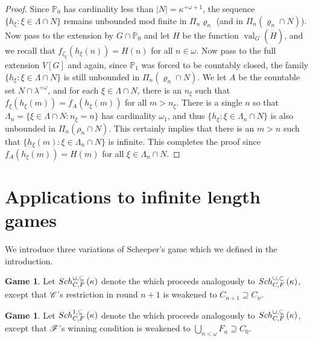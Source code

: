 \documentclass{amsart}
\theoremstyle{plain}
\theoremstyle{definition}
\newtheorem{game}[theorem]{Game}
\theoremstyle{remark}
\theoremstyle{plain}
\theoremstyle{definition}
\theoremstyle{remark}
\begin{document}
\begin{proof}
             Since $\mathbb P_0$ has cardinality less than $|N|=\kappa^{+\omega+1}$,
              the sequence $\{ h_\xi : \xi \in \Lambda\cap N\}$ remains unbounded
              mod finite in $\Pi_n \varrho_n$ (and in
               $\Pi_n (\varrho_n\cap N)$).  Now pass to the extension by
                $G\cap \mathbb P_0$ and let $H$ be the function
                 $\operatorname{val}_{G}(\dot H)$, and we recall
                 that $f_{\zeta_\xi}(h_\xi(n)) = H(n)$ for all $n\in \omega$.
           Now pass to the full extension $V[G]$ and again, since
            $\mathbb P_1$ was forced to be countably closed,
             the family $\{ h_\xi : \xi \in \Lambda\cap N\}$ is still
             unbounded in $\Pi_n (\varrho_n \cap N)$. We let
             $A$ be the countable set $N\cap \lambda^{+\omega}$,
             and for  each
             $\xi\in \Lambda\cap N$, there is an $n_\xi$ such that
              $f_{\xi}(h_\xi(m)) = f_A(h_\xi(m))$ for all $m>n_\xi$.
              There is a single $n$ so that $\Lambda_n
               = \{\xi\in \Lambda\cap N       : n_\xi = n\}$ has cardinality
                $\omega_1 $, and thus
                $\{ h_\xi : \xi\in \Lambda_n\cap N\}$ is also unbounded
                in $\Pi_n (\rho_n\cap N)$.
          This certainly implies that there is an $m>n$
          such that $\{ h_\xi (m) : \xi\in \Lambda_n\cap N\}$ is infinite.
          This completes the proof since  $f_{A}(h_\xi(m)) = H(m)$
          for all $\xi\in \Lambda_n\cap N$.
  \end{proof}





  \section{Applications to infinite length games}

  We introduce three variations of Scheeper's game which we defined in
  the introduction.

  \begin{game}
    Let \(Sch^{\cup,\subseteq}_{C,F}\left({\kappa}\right)\) denote the
     which proceeds analogously
    to \(Sch^{\cup,\subset}_{C,F}\left({\kappa}\right)\), except that \(\mathscr{C}\)'s restriction in round \(n+1\)
    is weakened to \(C_{n+1}\supseteq C_n\).
  \end{game}

  \begin{game}
    Let \(Sch^{1,\subseteq}_{C,F}\left({\kappa}\right)\) denote the
     which proceeds analogously
    to \(Sch^{\cup,\subseteq}_{C,F}\left({\kappa}\right)\), except that \(\mathscr{F}\)'s winning condition is
    weakened to \(\bigcup_{n<\omega}F_n\supseteq C_0\).
  \end{game}
\end{document}

